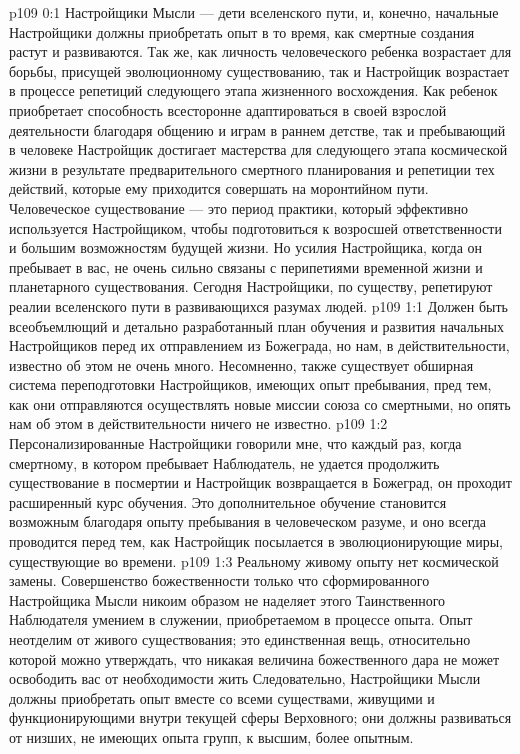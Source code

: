 \author{Одиночный Вестник}
\vs p109 0:1 Настройщики Мысли --- дети вселенского пути, и, конечно, начальные Настройщики должны приобретать опыт в то время, как смертные создания растут и развиваются. Так же, как личность человеческого ребенка возрастает для борьбы, присущей эволюционному существованию, так и Настройщик возрастает в процессе репетиций следующего этапа жизненного восхождения. Как ребенок приобретает способность всесторонне адаптироваться в своей взрослой деятельности благодаря общению и играм в раннем детстве, так и пребывающий в человеке Настройщик достигает мастерства для следующего этапа космической жизни в результате предварительного смертного планирования и репетиции тех действий, которые ему приходится совершать на моронтийном пути. Человеческое существование --- это период практики, который эффективно используется Настройщиком, чтобы подготовиться к возросшей ответственности и большим возможностям будущей жизни. Но усилия Настройщика, когда он пребывает в вас, не очень сильно связаны с перипетиями временной жизни и планетарного существования. Сегодня Настройщики, по существу, репетируют реалии вселенского пути в развивающихся разумах людей.
\vs p109 1:1 Должен быть всеобъемлющий и детально разработанный план обучения и развития начальных Настройщиков перед их отправлением из Божеграда, но нам, в действительности, известно об этом не очень много. Несомненно, также существует обширная система переподготовки Настройщиков, имеющих опыт пребывания, пред тем, как они отправляются осуществлять новые миссии союза со смертными, но опять нам об этом в действительности ничего не известно.
\vs p109 1:2 Персонализированные Настройщики говорили мне, что каждый раз, когда смертному, в котором пребывает Наблюдатель, не удается продолжить существование в посмертии и Настройщик возвращается в Божеград, он проходит расширенный курс обучения. Это дополнительное обучение становится возможным благодаря опыту пребывания в человеческом разуме, и оно всегда проводится перед тем, как Настройщик посылается в эволюционирующие миры, существующие во времени.
\vs p109 1:3 Реальному живому опыту нет космической замены. Совершенство божественности только что сформированного Настройщика Мысли никоим образом не наделяет этого Таинственного Наблюдателя умением в служении, приобретаемом в процессе опыта. Опыт неотделим от живого существования; это единственная вещь, относительно которой можно утверждать, что никакая величина божественного дара не может освободить вас от необходимости жить  Следовательно, Настройщики Мысли должны приобретать опыт вместе со всеми существами, живущими и функционирующими внутри текущей сферы Верховного; они должны развиваться от низших, не имеющих опыта групп, к высшим, более опытным.

